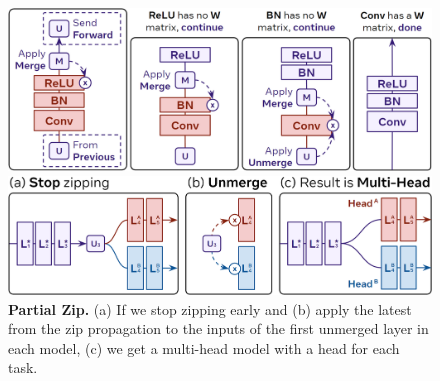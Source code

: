 \begin{figure}[t]
\centering

\begin{minipage}{0.48\linewidth}{
    \centering
    \includegraphics[width=\linewidth]{figures/imgs/zip_prop.png}
    \caption{{\bf Zip Propagation.} 
    We propagate  backward until we hit a layer with weights, merging merging element-wise layers (e.g., BatchNorm) along the way.
    }
    \label{fig:zip_prop}
}\end{minipage}
\hspace{1em}
\begin{minipage}{0.48\linewidth}{
    \centering
    \includegraphics[width=\linewidth]{figures/imgs/partial_zip.png}
    \caption{
        {\bf Partial Zip.}
        (a) If we stop zipping early and (b) apply the latest  from the zip propagation to the inputs of the first unmerged layer in each model, (c) we get a multi-head model with a head for each task.
    }
    \label{fig:partial_zip}
}\end{minipage}
\vspace{-10pt}
\end{figure}
